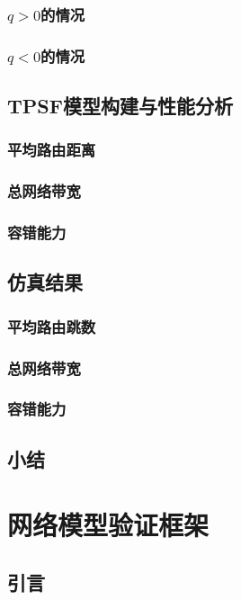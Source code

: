 \documentclass[master]{njuthesis}
\begin{document}
\subsection{$q>0$的情况}
\Blindtext
\subsection{$q<0$的情况}
\Blindtext
\section{TPSF模型构建与性能分析}
\blindtext
\subsection{平均路由距离}
\Blindtext
\subsection{总网络带宽}
\Blindtext
\subsection{容错能力}
\Blindtext
\section{仿真结果}
\subsection{平均路由跳数}
\Blindtext
\subsection{总网络带宽}
\Blindtext
\subsection{容错能力}
\Blindtext
\section{小结}
\blindtext

\chapter{网络模型验证框架}\label{chapter_experiments}
\section{引言}
\Blindtext
\end{document}
